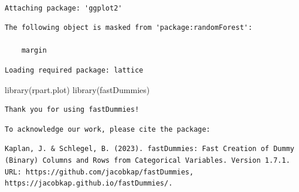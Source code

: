 \documentclass[
  super,
  preprint,
  3p]{elsarticle}
\newenvironment{Shaded}{\begin{snugshade}}{\end{snugshade}}
\newcommand{\FunctionTok}[1]{\textcolor[rgb]{0.28,0.35,0.67}{#1}}
\newcommand{\NormalTok}[1]{\textcolor[rgb]{0.00,0.23,0.31}{#1}}
\begin{document}
\begin{verbatim}

Attaching package: 'ggplot2'
\end{verbatim}

\begin{verbatim}
The following object is masked from 'package:randomForest':

    margin
\end{verbatim}

\begin{verbatim}
Loading required package: lattice
\end{verbatim}

\begin{Shaded}
\begin{Highlighting}[]
\FunctionTok{library}\NormalTok{(rpart.plot)}
\FunctionTok{library}\NormalTok{(fastDummies)}
\end{Highlighting}
\end{Shaded}

\begin{verbatim}
Thank you for using fastDummies!
\end{verbatim}

\begin{verbatim}
To acknowledge our work, please cite the package:
\end{verbatim}

\begin{verbatim}
Kaplan, J. & Schlegel, B. (2023). fastDummies: Fast Creation of Dummy (Binary) Columns and Rows from Categorical Variables. Version 1.7.1. URL: https://github.com/jacobkap/fastDummies, https://jacobkap.github.io/fastDummies/.
\end{verbatim}
\end{document}
